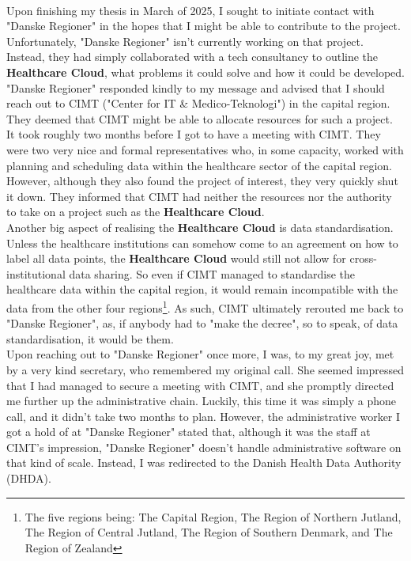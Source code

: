 \\
Upon finishing my thesis in March of 2025, I sought to initiate contact with "Danske Regioner" in the hopes that I might be able to contribute to the project. Unfortunately, "Danske Regioner" isn't currently working on that project. Instead, they had simply collaborated with a tech consultancy to outline the \textbf{Healthcare Cloud}, what problems it could solve and how it could be developed. "Danske Regioner" responded kindly to my message and advised that I should reach out to CIMT ("Center for IT \& Medico-Teknologi") in the capital region. They deemed that CIMT might be able to allocate resources for such a project.
\\
It took roughly two months before I got to have a meeting with CIMT. They were two very nice and formal representatives who, in some capacity, worked with planning and scheduling data within the healthcare sector of the capital region. However, although they also found the project of interest, they very quickly shut it down. They informed that CIMT had neither the resources nor the authority to take on a project such as the \textbf{Healthcare Cloud}.
\\
Another big aspect of realising the \textbf{Healthcare Cloud} is data standardisation. Unless the healthcare institutions can somehow come to an agreement on how to label all data points, the \textbf{Healthcare Cloud} would still not allow for cross-institutional data sharing. So even if CIMT managed to standardise the healthcare data within the capital region, it would remain incompatible with the data from the other four regions\footnote{The five regions being: The Capital Region, The Region of Northern Jutland, The Region of Central Jutland, The Region of Southern Denmark, and The Region of Zealand}. As such, CIMT ultimately rerouted me back to "Danske Regioner", as, if anybody had to "make the decree", so to speak, of data standardisation, it would be them.
\\
Upon reaching out to "Danske Regioner" once more, I was, to my great joy, met by a very kind secretary, who remembered my original call. She seemed impressed that I had managed to secure a meeting with CIMT, and she promptly directed me further up the administrative chain. Luckily, this time it was simply a phone call, and it didn't take two months to plan. However, the administrative worker I got a hold of at "Danske Regioner" stated that, although it was the staff at CIMT's impression, "Danske Regioner" doesn't handle administrative software on that kind of scale. Instead, I was redirected to the Danish Health Data Authority (DHDA).
